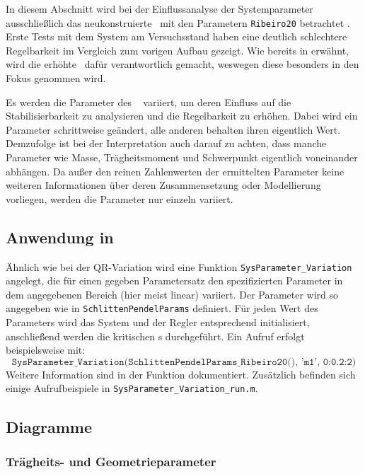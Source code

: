 In diesem Abschnitt wird bei der Einflussanalyse der Systemparameter ausschließlich das neukonstruierte \dpd\ mit den Parametern \texttt{Ribeiro20} betrachtet .
Erste Tests mit dem System am Versuchsstand haben eine deutlich schlechtere Regelbarkeit im Vergleich zum vorigen Aufbau gezeigt.
Wie bereits in  erwähnt, wird die erhöhte \crb\ dafür verantwortlich gemacht, weswegen diese besonders in den Fokus genommen wird.

Es werden die Parameter des \spds\  variiert, um deren Einfluss auf die Stabilisierbarkeit zu analysieren und die Regelbarkeit zu erhöhen.
Dabei wird ein Parameter schrittweise geändert, alle anderen behalten ihren eigentlich Wert.
Demzufolge ist bei der Interpretation auch darauf zu achten, dass manche Parameter wie Masse, Trägheitsmoment und Schwerpunkt eigentlich voneinander abhängen.
Da außer den reinen Zahlenwerten der ermittelten Parameter keine weiteren Informationen über deren Zusammensetzung oder Modellierung vorliegen, werden die Parameter nur einzeln variiert.


\subsection{Anwendung in \ml}

Ähnlich wie bei der QR-Variation wird eine Funktion \texttt{SysParameter\_Variation} angelegt, die für einen gegeben Parametersatz den spezifizierten Parameter in dem angegebenen Bereich (hier meist linear) variiert.
Der Parameter wird so angegeben wie in \texttt{SchlittenPendelParams} definiert.
Für jeden Wert des Parameters wird das System und der Regler entsprechend initialisiert, anschließend werden die kritischen \xots s durchgeführt.
Ein Aufruf erfolgt beispielsweise mit:
	\[
	\texttt{SysParameter\_Variation(SchlittenPendelParams\_Ribeiro20(), 'm1', 0:0.2:2)}
\]
Weitere Information sind in der Funktion dokumentiert.
Zusätzlich befinden sich einige Aufrufbeispiele in \texttt{SysParameter\_Variation\_run.m}.



\subsection{Diagramme}

\subsubsection{Trägheits- und Geometrieparameter}

